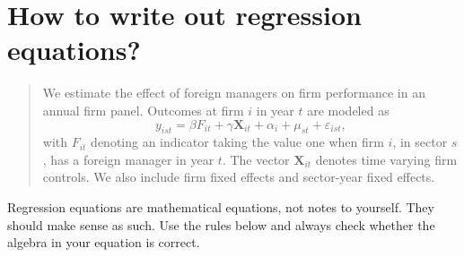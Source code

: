 \documentclass[12pt,a4paper]{article}
\begin{document}
\section{How to write out regression equations?}

\begin{quote}
We estimate the effect of foreign managers on firm performance in an annual firm panel. Outcomes at firm $i$ in year $t$ are modeled as
\begin{equation}
	y_{ist} = \beta F_{it} + \gamma \mathbf X_{it} + \alpha_i + \mu_{st} + \varepsilon_{ist},
\end{equation}
with $F_{it}$ denoting an indicator taking the value one when firm $i$, in sector $s$, has a foreign manager in year $t$. The vector $\mathbf X_{it}$ denotes time varying firm controls. We also include firm fixed effects and sector-year fixed effects.
\end{quote}

Regression equations are mathematical equations, not notes to yourself. They should make sense as such. Use the rules below and always check whether the algebra in your equation is correct.
\end{document}

